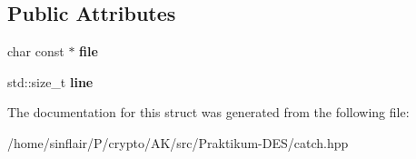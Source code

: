 \subsection*{Public Attributes}
\begin{DoxyCompactItemize}
\item 
\mbox{\label{structCatch_1_1SourceLineInfo_ad65537703e9f08c1fa7777fbc3f0c617}} 
char const  $\ast$ {\bfseries file}
\item 
\mbox{\label{structCatch_1_1SourceLineInfo_a841e5d696c7b9cde24e45e61dd979c77}} 
std\+::size\+\_\+t {\bfseries line}
\end{DoxyCompactItemize}


The documentation for this struct was generated from the following file\+:\begin{DoxyCompactItemize}
\item 
/home/sinflair/\+P/crypto/\+A\+K/src/\+Praktikum-\/\+D\+E\+S/catch.\+hpp\end{DoxyCompactItemize}
